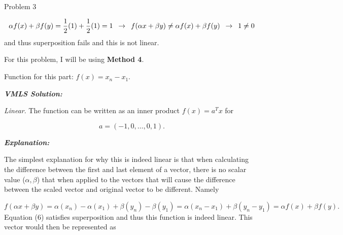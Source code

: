 \begin{problem}{Problem 3}
\begin{highlight}
        \begin{equation}
            \alpha f(x) + \beta f(y) = \frac{1}{2}(1) + \frac{1}{2}(1) = 1 \hspace*{5pt} \rightarrow \hspace*{5pt} f(\alpha x + \beta y) \neq \alpha f(x) + \beta f(y) \hspace*{5pt} \rightarrow \hspace*{5pt} 1 \neq 0
        \end{equation}
        and thus superposition fails and this is not linear.
    \end{highlight}

    \begin{highlight}
        For this problem, I will be using \textbf{Method 4}. \vspace*{1em}

        Function for this part: $f(x) = x_{n} - x_{1}$. \vspace*{1em}

        \textbf{\textit{VMLS Solution:}} \vspace*{1em}

        \textit{Linear}. The function can be written as an inner product $f(x) = a^{T}x$ for 

        \begin{equation}
            a = (-1, 0, \dots , 0, 1).
        \end{equation}

        \textbf{\textit{Explanation:}} \vspace*{1em}

        The simplest explanation for why this is indeed linear is that when calculating the difference between the first and last element of a vector, there is no scalar value ($\alpha , \beta$) that when applied to the vectors
        that will cause the difference between the scaled vector and original vector to be different. Namely 

        \begin{equation}
            f(\alpha x + \beta y) = \alpha (x_{n}) - \alpha (x_{1}) + \beta (y_{n}) - \beta (y_{1}) = \alpha (x_{n} - x_{1}) + \beta (y_{n} - y_{1}) = \alpha f(x) + \beta f(y).
        \end{equation}
        Equation (6) satisfies superposition and thus this function is indeed linear. This vector would then be represented as 


\end{highlight}
\end{problem}
